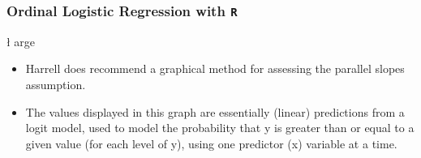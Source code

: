 \documentclass[00-GLMregslides.tex]{subfiles}
\begin{document}
\begin{frame}[fragile]
\frametitle{Ordinal Logistic Regression with \texttt{R}}
\l
arge
\begin{itemize}		
\item  Harrell does recommend a graphical method for assessing the parallel slopes assumption. 
\item The values displayed in this graph are essentially (linear) predictions from a logit model, used to model the probability that y is greater than or equal to a given value (for each level of y), using one predictor (x) variable at a time. 
\end{itemize}
\end{frame}
\end{document}
